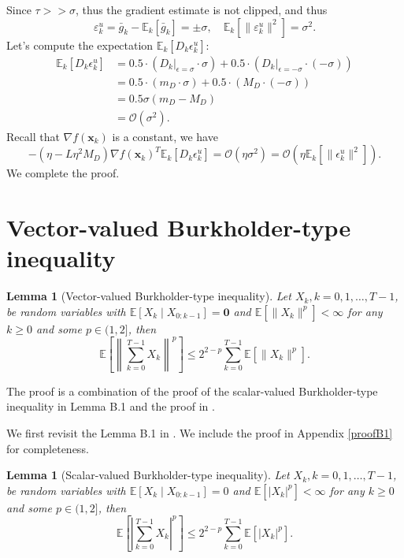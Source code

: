 \documentclass{article}
\newcommand{\bx}{\boldsymbol{x}}
\newcommand{\barg}{\bar{g}}
\theoremstyle{plain}
\newtheorem{lemma}[theorem]{Lemma}
\theoremstyle{definition}
\theoremstyle{remark}
\begin{document}
    Since $\tau>>\sigma$, thus the gradient estimate is not clipped, and thus
    \begin{equation*}
        \varepsilon_k^u= \barg_k - \mathbb{E}_k[\barg_k]=\pm \sigma, \quad \mathbb{E}_k[\|\varepsilon_k^u\|^2]=\sigma^2.
    \end{equation*}
Let's compute the expectation $\mathbb{E}_k[ D_k \epsilon_k^u ]$:$$\begin{aligned}
\mathbb{E}_k[ D_k \epsilon_k^u ] &= 0.5 \cdot (D_k|_{\epsilon=\sigma} \cdot \sigma) + 0.5 \cdot (D_k|_{\epsilon=-\sigma} \cdot (-\sigma)) \\
&= 0.5 \cdot (m_D \cdot \sigma) + 0.5 \cdot (M_D \cdot (-\sigma)) \\
&= 0.5 \sigma (m_D - M_D)\\
& = \mathcal{O}(\sigma^2).
\end{aligned}$$
Recall that $\nabla f(\bx_k)$ is a constant, we have
\begin{equation*}
    -(\eta - L\eta^2 M_D)\nabla f(\bx_k)^T\mathbb{E}_k[D_k\epsilon_k^u] = \mathcal{O}(\eta\sigma^2)=\mathcal{O}(\eta\mathbb{E}_k[\|\epsilon_k^u\|^2]).
\end{equation*}
We complete the proof.

\section{Vector-valued Burkholder-type inequality}\label{append_E}

\begin{lemma}[Vector-valued Burkholder-type inequality]\label{append_C:lemma1}
Let $X_k, k=0,1,\dots,T-1$, be random variables with $\mathbb{E}[X_k\mid X_{0:k-1}]=\boldsymbol{0}$ and $\mathbb{E}[\|X_k\|^{p}]<\infty$ for any $k\geq 0$ and some $p \in (1,2]$, then 
\begin{equation*}
\mathbb{E}\left[ \left\| \sum_{k=0}^{T-1} X_k \right\| ^{p} \right] \leq 2^{2-p} \sum_{k=0}^{T-1} \mathbb{E}[\|X_k\|^{p}].
\end{equation*}
\end{lemma}	

 The proof is a combination of the proof of the scalar-valued Burkholder-type inequality in \cite{Fang2025High} Lemma B.1 and the proof in \cite{Hubler2024Gradient}.

We first revisit the Lemma B.1 in \cite{Fang2025High}. We include the proof in Appendix \ref{proofB1} for completeness.


\begin{lemma}[Scalar-valued Burkholder-type inequality]\label{append_C:lemma2}
Let $X_k, k=0,1,\dots,T-1$, be random variables with $\mathbb{E}[X_k\mid X_{0:k-1}]=0$ and $\mathbb{E}[|X_k|^{p}]<\infty$ for any $k\geq 0$ and some $p \in (1,2]$, then 
\begin{equation}\label{append:eq2}
\mathbb{E}\left[ \left| \sum_{k=0}^{T-1} X_k \right| ^{p} \right] \leq 2^{2-p} \sum_{k=0}^{T-1} \mathbb{E}[|X_k|^{p}].
\end{equation}
\end{lemma}	
\end{document}
